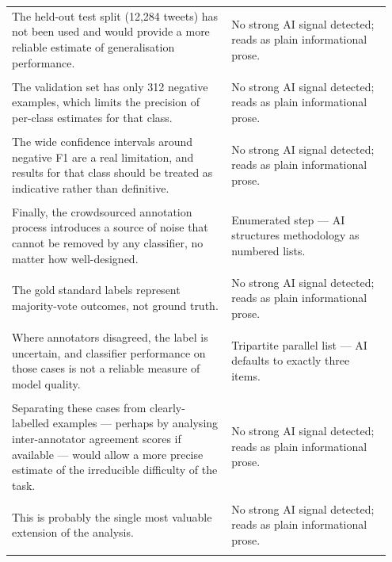 \documentclass[11pt]{article}
\begin{document}
\begin{longtable}{|p{0.55\linewidth}|p{0.40\linewidth}|}
\hline
\rule{0pt}{3.5cm} & \\
\hline
The held-out test split (12,284 tweets) has not been used and would provide a more reliable estimate of generalisation performance. & No strong AI signal detected; reads as plain informational prose. \\[2pt]
\hline
\rule{0pt}{3.5cm} & \\
\hline
The validation set has only 312 negative examples, which limits the precision of per-class estimates for that class. & No strong AI signal detected; reads as plain informational prose. \\[2pt]
\hline
\rule{0pt}{3.5cm} & \\
\hline
The wide confidence intervals around negative F1 are a real limitation, and results for that class should be treated as indicative rather than definitive. & No strong AI signal detected; reads as plain informational prose. \\[2pt]
\hline
\rule{0pt}{3.5cm} & \\
\hline
Finally, the crowdsourced annotation process introduces a source of noise that cannot be removed by any classifier, no matter how well-designed. & Enumerated step --- AI structures methodology as numbered lists. \\[2pt]
\hline
\rule{0pt}{3.5cm} & \\
\hline
The gold standard labels represent majority-vote outcomes, not ground truth. & No strong AI signal detected; reads as plain informational prose. \\[2pt]
\hline
\rule{0pt}{3.5cm} & \\
\hline
Where annotators disagreed, the label is uncertain, and classifier performance on those cases is not a reliable measure of model quality. & Tripartite parallel list --- AI defaults to exactly three items. \\[2pt]
\hline
\rule{0pt}{3.5cm} & \\
\hline
Separating these cases from clearly-labelled examples --- perhaps by analysing inter-annotator agreement scores if available --- would allow a more precise estimate of the irreducible difficulty of the task. & No strong AI signal detected; reads as plain informational prose. \\[2pt]
\hline
\rule{0pt}{3.5cm} & \\
\hline
This is probably the single most valuable extension of the analysis. & No strong AI signal detected; reads as plain informational prose. \\[2pt]
\hline
\rule{0pt}{3.5cm} & \\

\end{longtable}
\end{document}
